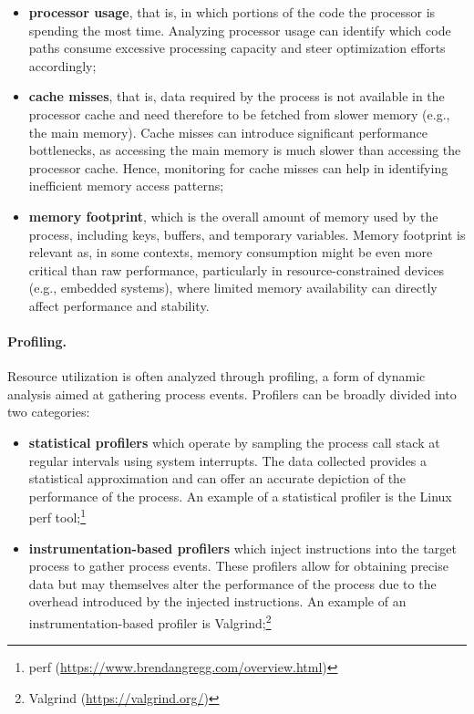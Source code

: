 \begin{itemize}
	
	\item \textbf{processor usage}, that is, in which portions of the code the processor is spending the most time. Analyzing processor usage can identify which code paths consume excessive processing capacity and steer optimization efforts accordingly;
	
	\item \textbf{cache misses}, that is, data required by the process is not available in the processor cache and need therefore to be fetched from slower memory (e.g., the main memory). Cache misses can introduce significant performance bottlenecks, as accessing the main memory is much slower than accessing the processor cache. Hence, monitoring for cache misses can help in identifying inefficient memory access patterns;
	
	\item \textbf{memory footprint}, which is the overall amount of memory used by the process, including keys, buffers, and temporary variables. Memory footprint is relevant as, in some contexts, memory consumption might be even more critical than raw performance, particularly in resource-constrained devices (e.g., embedded systems), where limited memory availability can directly affect performance and stability.
	
\end{itemize}

\paragraph*{Profiling.} Resource utilization is often analyzed through profiling, a form of dynamic analysis aimed at gathering process events. Profilers can be broadly divided into two categories:

\begin{itemize} 
	
	\item \textbf{statistical profilers} which operate by sampling the process call stack at regular intervals using system interrupts. The data collected provides a statistical approximation and can offer an accurate depiction of the performance of the process. An example of a statistical profiler is the Linux perf tool;\footnote{perf (\url{https://www.brendangregg.com/overview.html})}
	
	\item \textbf{instrumentation-based profilers} which inject instructions into the target process to gather process events. These profilers allow for obtaining precise data but may themselves alter the performance of the process due to the overhead introduced by the injected instructions. An example of an instrumentation-based profiler is Valgrind;\footnote{Valgrind (\url{https://valgrind.org/})}
	
\end{itemize}


